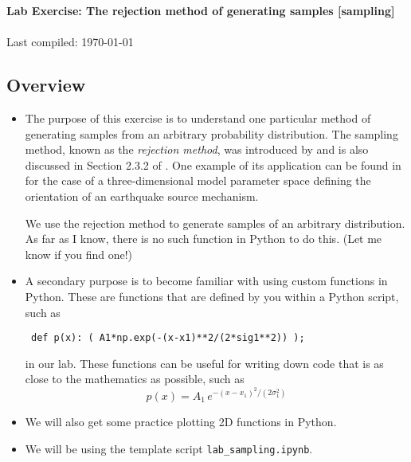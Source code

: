 \documentclass[11pt,titlepage,fleqn]{article}
\begin{document}

\begin{spacing}{1.2}
\centering
{\large \bf Lab Exercise: The rejection method of generating samples [sampling]} \\
\cltag\ \\
Last compiled: \today
\end{spacing}


\subsection*{Overview}

\begin{itemize}
\item The purpose of this exercise is to understand one particular method of generating samples from an arbitrary probability distribution. The sampling method, known as the {\em rejection method}, was introduced by \citet{vonNeumann1951} and is also discussed in Section 2.3.2 of \citet{Tarantola2005}. One example of its application can be found in \citet{SilwalTape2016} for the case of a three-dimensional model parameter space defining the orientation of an earthquake source mechanism.

We use the rejection method to generate samples of an arbitrary distribution. As far as I know, there is no such function in Python to do this. (Let me know if you find one!)

\item A secondary purpose is to become familiar with using custom functions in Python. These are functions that are defined by you within a Python script, such as

\verb+ def p(x): ( A1*np.exp(-(x-x1)**2/(2*sig1**2)) );+

in our lab. These functions can be useful for writing down code that is as close to the mathematics as possible, such as
%
\begin{equation}
p(x) = A_1\,e^{-(x-x_1)^2/(2\sigma_1^2)}
\end{equation}

\item We will also get some practice plotting 2D functions in Python.

\item We will be using the template script \verb+lab_sampling.ipynb+.

%

\end{itemize}
\end{document}
